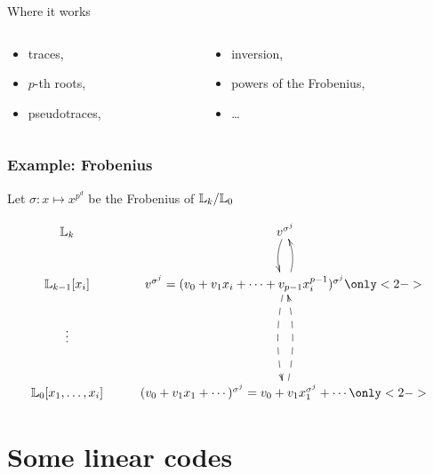 \documentclass[10pt]{beamer}
\begin{document}
\begin{frame}
\begin{columns}
\begin{column}{0.85\textwidth}
      \begin{block}{Where it works}
        \begin{columns}[t]
          \begin{column}{0.5\textwidth}
            \begin{itemize}
            \item traces,
            \item $p$-th roots,
            \item pseudotraces,
            \end{itemize}
          \end{column}
          \begin{column}{0.5\textwidth}
            \begin{itemize}
            \item inversion,
            \item powers of the Frobenius,
            \item \ldots
            \end{itemize}
          \end{column}
        \end{columns}
      \end{block}
    \end{column}
  \end{columns}
\end{frame}


\begin{frame}
  \frametitle{Example: Frobenius}
  
  Let $\sigma : x \mapsto x^{p^d}$ be the Frobenius of $\mathbb{L}_k/\mathbb{L}_0$

  \[\xymatrix{
    \LK_k & v^{\sigma^j}\ar@/_/[d]\\
    \LK_{k-1}[x_i] & v^{\sigma^j} = (v_0 + v_1x_i + \cdots + v_{p-1}x_i^{p-1})^{\sigma^j}\ar@{-->}@/_/[dd]\only<2->{\ar@/_/[u]}\\
    \vdots & \\
    \LK_0[x_1,\ldots,x_i] & (v_0 + v_1x_1 + \cdots)^{\sigma^j} = v_0 + v_1x_1^{\sigma^j} + \cdots\only<2->{\ar@{-->}@/_/[uu]}
  }\]
\end{frame}


\section{Some linear codes}
\end{document}
